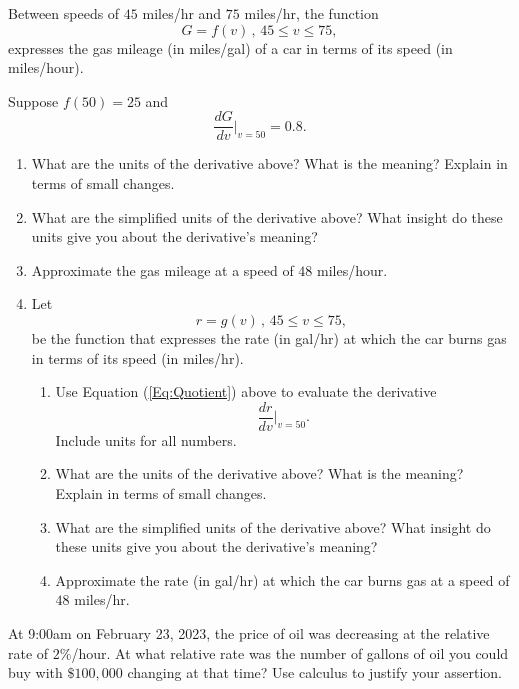 \documentclass{ximera}
\begin{document}
\begin{exercise}  \label{Qdfbv4trttg}
Between speeds of $45$ miles/hr and $75$ miles/hr, the function
\[
    G = f(v) \, , \, 45 \leq v \leq 75,
\]
expresses the gas mileage (in miles/gal) of a car in terms of its speed (in miles/hour).

Suppose $f(50)=25$ and 
\[
  \frac{dG}{dv}\Big|_{v=50} = 0.8.
\]

\begin{enumerate}
\item What are the units of the derivative above? What is the meaning? Explain in terms of small changes.

\item What are the simplified units of the derivative above? What insight do these units give you about the derivative's meaning?

\item Approximate the gas mileage at a speed of $48$ miles/hour.

\item Let 
\[
  r=g(v) \, , \, 45 \leq v \leq 75,
\]
be the function that expresses the rate (in gal/hr) at which the car burns gas in terms of its speed (in miles/hr).

\begin{enumerate}  
\item Use Equation (\ref{Eq:Quotient}) above to evaluate the derivative
\[
  \frac{dr}{dv}\Big|_{v=50} .
\]
Include units for all numbers.

\item What are the units of the derivative above? What is the meaning? Explain in terms of small changes.

\item What are the simplified units of the derivative above? What insight do these units give you about the derivative's meaning?

\item Approximate the rate (in gal/hr) at which the car burns gas at a speed of $48$ miles/hr.

\end{enumerate}

\end{enumerate}

\end{exercise}


\begin{exercise}  \label{EEdfbygyhnnjjhh}
At 9:00am on February 23, 2023, the price of oil was decreasing at the relative rate of $2\%$/hour. At what relative rate was the number of gallons of oil you could buy with $\$100,000$ changing at that time? Use calculus to justify your assertion. 
\end{exercise}
\end{document}
